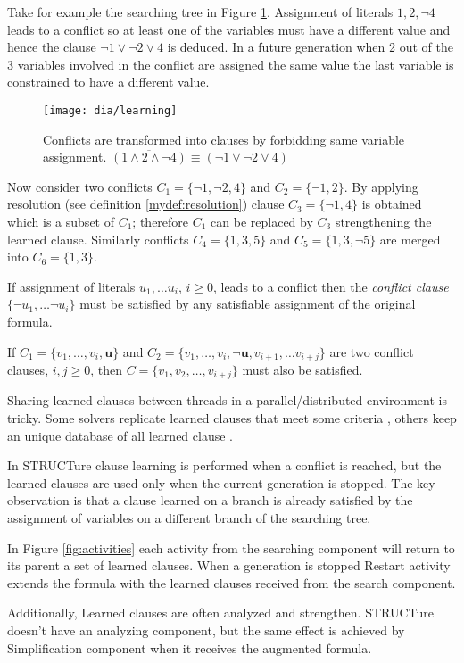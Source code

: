 Take for example the searching tree in Figure \ref{fig:learning}.
Assignment of literals $1, 2, \neg 4$ leads to a conflict so at
least one of the variables must have a different value and hence
the clause $\neg 1 \lor \neg 2 \lor 4$ is deduced. In a future
generation when 2 out of the 3 variables involved in the conflict
are assigned the same value the last variable is constrained to
have a different value.

\begin{figure}
  \centering
  \texttt{[image: dia/learning]}
  \caption{Conflicts are transformed into clauses by forbidding
  same variable assignment.
  $\overline{(1 \land 2 \land \neg 4)} \equiv (\neg 1 \lor \neg 2 \lor 4)$}
  \label{fig:learning}
\end{figure}

Now consider two conflicts $C_1 = \{ \neg 1, \neg 2, 4 \}$ and
$C_2 = \{ \neg 1, 2 \}$.  By applying resolution (see definition
\ref{mydef:resolution}) clause $C_3 = \{ \neg 1, 4 \}$ is obtained
which is a subset of $C_1$; therefore $C_1$ can be replaced by $C_3$
strengthening the learned clause. Similarly conflicts
$C_4 = \{ 1, 3, 5 \}$ and $C_5 = \{1, 3, \neg 5\}$ are merged
into $C_6 = \{ 1, 3 \}$.

\begin{myprop}
  If assignment of literals $u_1, \ldots u_i$, $i \ge 0$, leads to
  a conflict then the \emph{conflict clause} $\{ \neg u_1, \ldots
  \neg u_i \}$ must be satisfied by any satisfiable assignment of
  the original formula.
\end{myprop}

\begin{myprop}
  If $C_1 = \{ v_1, \ldots, v_i, \mathbf{u} \}$ and $C_2 = \{
  v_1, \ldots, v_i, \mathbf{\neg u}, v_{i+1}, \ldots v_{i+j} \}$
  are two conflict clauses, $i, j \ge 0$, then $C = \{ v_1, v_2,
  \ldots, v_{i+j} \}$ must also be satisfied.
\end{myprop}

Sharing learned clauses between threads in a parallel/distributed
environment is tricky.  Some solvers replicate learned clauses that
meet some criteria \cite{Hamadi09manysat:a}, others keep an unique
database of all learned clause \cite{mine:miraxt}.

In STRUCTure clause learning is performed when a conflict is reached,
but the learned clauses are used only when the current generation is
stopped. The key observation is that a clause learned on a branch
is already satisfied by the assignment of variables on a different
branch of the searching tree.

In Figure \ref{fig:activities} each activity from the searching
component will return to its parent a set of learned clauses. When
a generation is stopped Restart activity extends the formula with
the learned clauses received from the search component.

Additionally, Learned clauses are often analyzed and
strengthen\cite{Audemard_ageneralized}. STRUCTure doesn't have
an analyzing component, but the same effect is achieved by
Simplification component when it receives the augmented formula.
